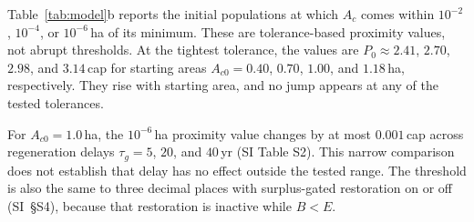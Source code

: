 Table~\ref{tab:model}b reports the initial populations at which $A_c$ comes within $10^{-2}$, $10^{-4}$, or $10^{-6}$\,ha of its minimum. These are tolerance-based proximity values, not abrupt thresholds. At the tightest tolerance, the values are $P_0\approx2.41$, $2.70$, $2.98$, and $3.14$\,cap for starting areas $A_{c0}=0.40$, $0.70$, $1.00$, and $1.18$\,ha, respectively. They rise with starting area, and no jump appears at any of the tested tolerances.

For $A_{c0}=1.0$\,ha, the $10^{-6}$\,ha proximity value changes by at most $0.001$\,cap across regeneration delays $\tau_g=5$, $20$, and $40$\,yr (SI Table S2). This narrow comparison does not establish that delay has no effect outside the tested range. The threshold is also the same to three decimal places with surplus-gated restoration on or off (SI~\S S4), because that restoration is inactive while $B<E$.


